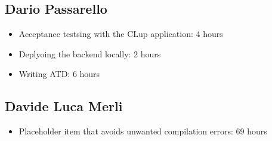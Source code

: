 \subsection{Dario Passarello}
\begin{itemize}
    \item Acceptance testsing with the CLup application: 4 hours
    \item Deplyoing the backend locally: 2 hours
    \item Writing ATD: 6 hours
\end{itemize}

\subsection{Davide Luca Merli}
\begin{itemize}
    \item Placeholder item that avoids unwanted compilation errors: 69 hours
\end{itemize}